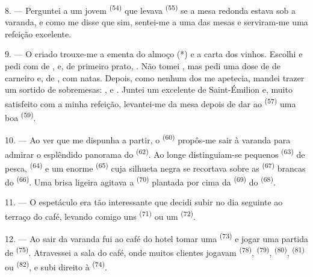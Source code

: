 8. --- Perguntei a um jovem  \textsuperscript{(54)} que levava
 \textsuperscript{(55)} se a mesa redonda estava sob a
varanda, e como me disse que sim, sentei-me a uma das mesas e serviram-me
uma refeição excelente.


\VUsaut{4.0mm}
\VUsaut{3.0mm}

9. --- O criado trouxe-me a ementa do almoço (*) e a carta dos vinhos.
Escolhi e pedi  com  de
, e, de primeiro prato, .
Não tomei , mas pedi uma dose de  de carneiro
e, de ,  com natas. Depois, como nenhum
dos  me apetecia, mandei trazer um sortido de sobremesas:
,  e . Juntei um excelente
 de Saint-Émilion e, muito satisfeito com a minha refeição,
levantei-me da mesa depois de dar ao  \textsuperscript{(57)} uma boa
 \textsuperscript{(59)}.

10. --- Ao ver que me dispunha a partir, o 
\textsuperscript{(60)} propôs-me sair à varanda para admirar o esplêndido
panorama do  \textsuperscript{(62)}. Ao longe distinguiam-se
pequenos  \textsuperscript{(63)} de pesca, 
\textsuperscript{(64)} e um enorme  \textsuperscript{(65)} cuja
silhueta negra se recortava sobre as  \textsuperscript{(67)} brancas
do  \textsuperscript{(66)}. Uma brisa ligeira agitava a
 \textsuperscript{(70)} plantada por cima da 
\textsuperscript{(69)} do  \textsuperscript{(68)}.

\VUsaut{3.0mm}
\VUsaut{3.0mm}

11. --- O espetáculo era tão interessante que decidi subir no dia
seguinte ao terraço do café, levando comigo uns 
\textsuperscript{(71)} ou um  \textsuperscript{(72)}.

12. --- Ao sair da varanda fui ao café do hotel tomar uma
 \textsuperscript{(73)} e jogar uma partida de 
\textsuperscript{(75)}. Atravessei a sala do café, onde muitos clientes jogavam
 \textsuperscript{(78)},  \textsuperscript{(79)},
 \textsuperscript{(80)},  \textsuperscript{(81)} ou
 \textsuperscript{(82)}, e subi direito à 
\textsuperscript{(74)}.


